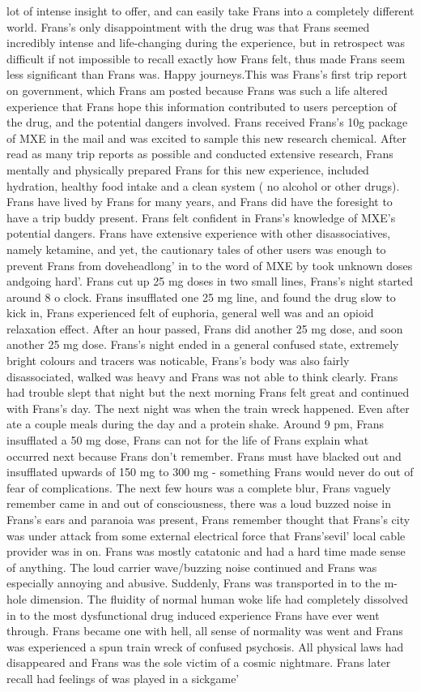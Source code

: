 \documentclass[12pt]{book}
\begin{document}
lot of intense insight to offer, and can easily take Frans into a completely different world. Frans's only disappointment with the drug was that Frans seemed incredibly intense and life-changing during the experience, but in retrospect was difficult if not impossible to recall exactly how Frans felt, thus made Frans seem less significant than Frans was. Happy journeys.This was Frans's first trip report on government, which Frans am posted because Frans was such a life altered experience that Frans hope this information contributed to users perception of the drug, and the potential dangers involved. Frans received Frans's 10g package of MXE in the mail and was excited to sample this new research chemical. After read as many trip reports as possible and conducted extensive research, Frans mentally and physically prepared Frans for this new experience, included hydration, healthy food intake and a clean system ( no alcohol or other drugs). Frans have lived by Frans for many years, and Frans did have the foresight to have a trip buddy present. Frans felt confident in Frans's knowledge of MXE's potential dangers. Frans have extensive experience with other disassociatives, namely ketamine, and yet, the cautionary tales of other users was enough to prevent Frans from doveheadlong' in to the word of MXE by took unknown doses andgoing hard'. Frans cut up 25 mg doses in two small lines, Frans's night started around 8 o clock. Frans insufflated one 25 mg line, and found the drug slow to kick in, Frans experienced felt of euphoria, general well was and an opioid relaxation effect. After an hour passed, Frans did another 25 mg dose, and soon another 25 mg dose. Frans's night ended in a general confused state, extremely bright colours and tracers was noticable, Frans's body was also fairly disassociated, walked was heavy and Frans was not able to think clearly. Frans had trouble slept that night but the next morning Frans felt great and continued with Frans's day. The next night was when the train wreck happened. Even after ate a couple meals during the day and a protein shake. Around 9 pm, Frans insufflated a 50 mg dose, Frans can not for the life of Frans explain what occurred next because Frans don't remember. Frans must have blacked out and insufflated upwards of 150 mg to 300 mg - something Frans would never do out of fear of complications. The next few hours was a complete blur, Frans vaguely remember came in and out of consciousness, there was a loud buzzed noise in Frans's ears and paranoia was present, Frans remember thought that Frans's city was under attack from some external electrical force that Frans'sevil' local cable provider was in on. Frans was mostly catatonic and had a hard time made sense of anything. The loud carrier wave/buzzing noise continued and Frans was especially annoying and abusive. Suddenly, Frans was transported in to the m-hole dimension. The fluidity of normal human woke life had completely dissolved in to the most dysfunctional drug induced experience Frans have ever went through. Frans became one with hell, all sense of normality was went and Frans was experienced a spun train wreck of confused psychosis. All physical laws had disappeared and Frans was the sole victim of a cosmic nightmare. Frans later recall had feelings of was played in a sickgame' 
\end{document}
